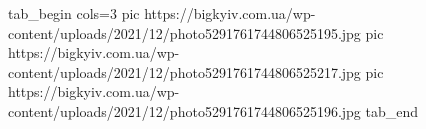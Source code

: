 
 
 
 
 

\ifcmt
  tab_begin cols=3
     pic https://bigkyiv.com.ua/wp-content/uploads/2021/12/photo5291761744806525195.jpg
     pic https://bigkyiv.com.ua/wp-content/uploads/2021/12/photo5291761744806525217.jpg
		 pic https://bigkyiv.com.ua/wp-content/uploads/2021/12/photo5291761744806525196.jpg
  tab_end
\fi
